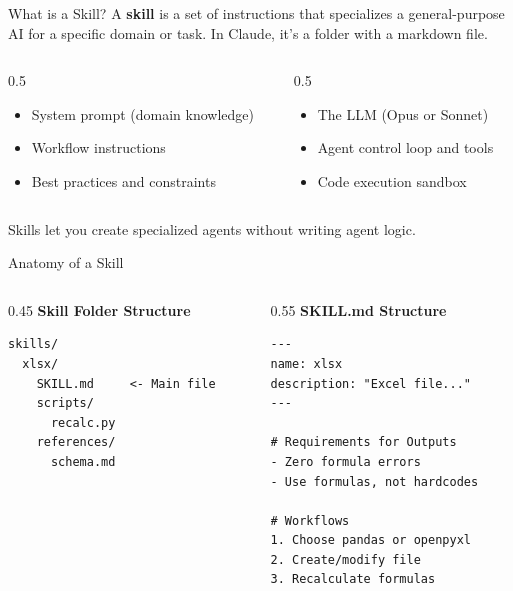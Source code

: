 \documentclass[aspectratio=169]{beamer}
\begin{document}
\begin{frame}{What is a Skill?}
A \textbf{skill} is a set of instructions that specializes a general-purpose AI for a specific domain or task. In Claude, it's a folder with a markdown file.
\vspace{0.3cm}
\begin{columns}[T]
\begin{column}{0.5\textwidth}
\begin{shadedbox}[title=\textbf{A Skill Provides}]
\begin{itemize}\small
  \item System prompt (domain knowledge)
  \item Workflow instructions
  \item Best practices and constraints
\end{itemize}
\end{shadedbox}
\end{column}
\begin{column}{0.5\textwidth}
\begin{shadedbox}[title=\textbf{The AI Platform Provides}]
\begin{itemize}\small
  \item The LLM (Opus or Sonnet)
  \item Agent control loop and tools
  \item Code execution sandbox
\end{itemize}
\end{shadedbox}
\end{column}
\end{columns}
\vspace{0.3cm}
Skills let you create \alert{specialized agents without writing agent logic}.
\end{frame}

\begin{frame}[fragile]{Anatomy of a Skill}
\begin{columns}[T]
\begin{column}{0.45\textwidth}
\textbf{Skill Folder Structure}\small
\begin{verbatim}
skills/
  xlsx/
    SKILL.md     <- Main file
    scripts/
      recalc.py
    references/
      schema.md
\end{verbatim}
\end{column}
\begin{column}{0.55\textwidth}
\textbf{SKILL.md Structure}\small
\begin{verbatim}
---
name: xlsx
description: "Excel file..."
---

# Requirements for Outputs
- Zero formula errors
- Use formulas, not hardcodes

# Workflows
1. Choose pandas or openpyxl
2. Create/modify file
3. Recalculate formulas
\end{verbatim}
\end{column}
\end{columns}
\end{frame}
\end{document}
